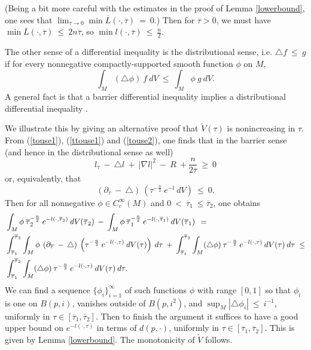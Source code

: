 \documentclass[12pt]{amsart}
\numberwithin{equation}{section}
\theoremstyle{plain}
\theoremstyle{definition}
\theoremstyle{remark}
\begin{document}
(Being a bit more careful with the
estimates in the proof of Lemma \ref{lowerbound}, one sees that
$\lim_{\overline{\tau} \rightarrow 0} 
\min \overline{L}(\cdot, \overline{\tau}) \: = \: 0$.)
Then for $\overline{\tau} > 0$, we must have
$\min \overline{L}(\cdot, \overline{\tau}) \: \le \: 
2n \overline{\tau}$, so $\min l(\cdot, \overline{\tau}) \: \le \: 
\frac{n}{2}$.

The other sense of a differential inequality is the distributional
sense, i.e. $\triangle f \: \le \: g$ if for every nonnegative
compactly-supported smooth function $\phi$ on $M$,
\begin{equation}
\int_M (\triangle \phi) \: f \: dV \: \le \: \int_M \phi \: g \: dV.
\end{equation}
A general fact is that a barrier differential inequality implies
a distributional differential inequality
\cite{Ishii,Ye1}.

We illustrate this by giving an alternative proof that 
$\tilde{V}(\tau)$ is nonincreasing in $\tau$.
From (\ref{touse1}), (\ref{ttouse1}) and
(\ref{touse2}),
one finds that in the barrier sense (and hence in the distributional sense
as well)
\begin{equation}
l_{\overline{\tau}} \: - \: \triangle l \: + \: |\nabla l|^2 \: - \: R
\: + \frac{n}{2\overline{\tau}} \: \ge \: 0
\end{equation}
or, equivalently, that
\begin{equation} \label{illustrate}
\left( \partial_{\overline{\tau}} \: -\: \triangle \right) \:
\left( \tau^{-\frac{n}{2}} \: e^{-l}  \: dV \right) \: \le \: 0.
\end{equation}
Then for all nonnegative $\phi \in C^\infty_c(M)$ and
$0 \: < \: \overline{\tau}_1 \: \le \overline{\tau}_2$, one obtains
\begin{align} \label{pphieqn}
& \int_M \phi \: \overline{\tau}_2^{-\frac{n}{2}} \:
e^{-l(\cdot,\overline{\tau}_2)} \: dV(\overline{\tau}_2) \: - \:
\int_M \phi \: \overline{\tau}_1^{-\frac{n}{2}} \:
e^{-l(\cdot,\overline{\tau}_1)} \: dV(\overline{\tau}_1) \: 
\: = \: \\
& \int_{\overline{\tau}_1}^{\overline{\tau}_2} \int_M  \phi \: 
\left( \partial_{\overline{\tau}} \: -\: \triangle \right) \: \left(
\tau^{-\frac{n}{2}} \:
e^{-l(\cdot,\tau)} \: dV(\tau) \right) \: d\tau \: + \:
\int_{\overline{\tau}_1}^{\overline{\tau}_2} \int_M (\triangle \phi) \:
\tau^{-\frac{n}{2}} \:
e^{-l(\cdot,\tau)} \: dV(\tau) \: d\tau \: \le \notag \\
& 
\int_{\overline{\tau}_1}^{\overline{\tau}_2} \int_M (\triangle \phi) \:
\tau^{-\frac{n}{2}} \:
e^{-l(\cdot,\tau)} \: dV(\tau) \: d\tau.   \notag
\end{align} 
We can find a sequence $\{\phi_i\}_{i=1}^\infty$ of such functions $\phi$ 
with range $[0,1]$ so
that $\phi_i$ is one on $B(p, i)$, vanishes outside of $B(p, i^2)$, and
$\sup_M |\triangle \phi_i| \: \le \: i^{-1}$,
uniformly in $\tau \in [\overline{\tau}_1, \overline{\tau}_2]$.
Then to finish the argument it suffices to have a good upper bound on
$e^{-l(\cdot,\tau)}$ in terms of $d(p, \cdot)$, uniformly in 
$\tau \in [\overline{\tau}_1, \overline{\tau}_2]$.
This is given by Lemma \ref{lowerbound}.
The monotonicity of $\tilde{V}$ follows.
\end{document}
